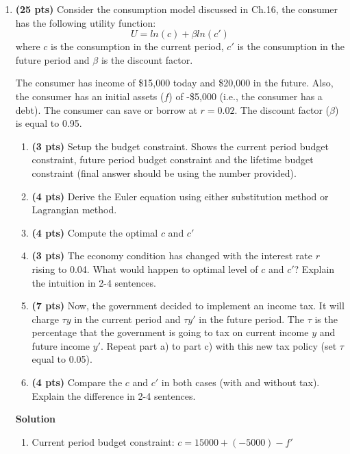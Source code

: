 \documentclass[addpoints,12pt,answers]{exam}
\begin{document}
	\vspace*{3em}
	
	
	\vspace*{3em}
	
	\begin{enumerate}[label=\textbf{\arabic*.}, itemsep=15pt]
		
		
		\item \textbf{(25  pts)}\label{P1}  Consider the consumption model discussed in Ch.16, the consumer has the following utility function:
		\[U = ln(c) + \beta ln(c')\]
		where $c$ is the consumption in the current period, $c'$ is the consumption in the future period and $\beta$ is the discount factor.
		
		The consumer has income of \$15,000 today and \$20,000 in the future. Also, the consumer has an initial assets ($f$) of -\$5,000 (i.e., the consumer has a debt). The consumer can save or borrow at $r= 0.02$. The discount factor ($\beta$) is equal to 0.95.
		\begin{enumerate}[label=(\alph*)]
			\item \textbf{(3  pts)} Setup the budget constraint. Shows the current period budget constraint, future period budget constraint and the lifetime budget constraint (final answer should be using the number provided).
			\item \textbf{(4  pts)} Derive the Euler equation using either substitution method or Lagrangian method. 
			\item \textbf{(4  pts)} Compute the optimal $c$ and $c'$
			\item \textbf{(3  pts)} The economy condition has changed with the interest rate $r$ rising to 0.04. What would happen to optimal level of $c$ and $c'$? Explain the intuition in 2-4 sentences.
			\item \textbf{(7  pts)} Now, the government decided to implement an income tax. It will charge $\tau y$ in the current period and $\tau y'$ in the future period. The $\tau$ is the percentage that the government is going to tax on current income $y$ and future income $y'$. Repeat part a) to part c) with this new tax policy (set $\tau$ equal to 0.05).
			\item \textbf{(4  pts)} Compare the $c$ and $c'$ in both cases (with and without tax). Explain the difference in 2-4 sentences.
		\end{enumerate}
		\clearpage
		\textbf{Solution}
		\begin{enumerate}[label=(\alph*)]
			\item Current period budget constraint: $c = 15000 +(-5000) - f'$
			

\end{enumerate}
\end{enumerate}
\end{document}
